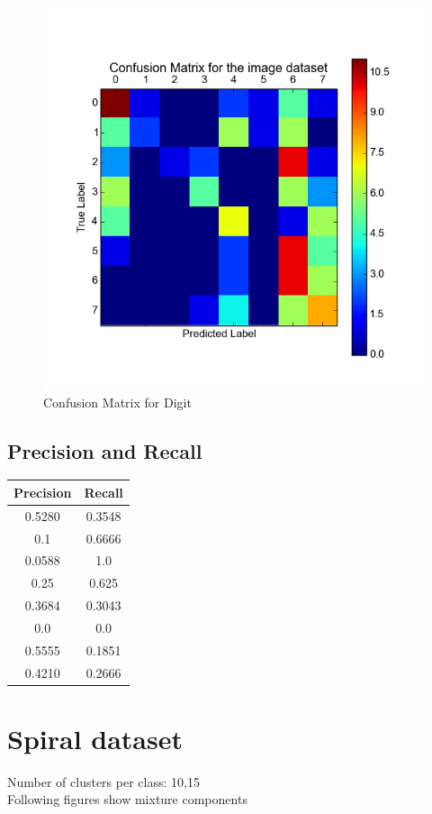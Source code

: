 \documentclass[11pt,a4paper]{article}
\begin{document}
\begin{minipage}[b]{0.5\textwidth}
\begin{figure}[H]
  \centering
  \includegraphics[width=.8\linewidth]{Figures/confusion_HW.png}
  \caption{Confusion Matrix for Digit}
  \label{fig:sfig1}
\end{figure}%
\end{minipage}

\subsection{Precision and Recall}

\begin{center}
\begin{tabular}{|c|c|}
\hline
\textbf{Precision} & \textbf{Recall} \\ \hline
0.5280 & 0.3548 \\ \hline
0.1 & 0.6666 \\ \hline
0.0588 & 1.0 \\ \hline
0.25 & 0.625 \\ \hline
0.3684 & 0.3043 \\ \hline
0.0 & 0.0 \\ \hline
0.5555 & 0.1851 \\ \hline
0.4210 & 0.2666 \\ \hline
\end{tabular}

\end{center}

\section{Spiral dataset}
Number of clusters per class: 10,15
\\Following figures show mixture components
\end{document}
